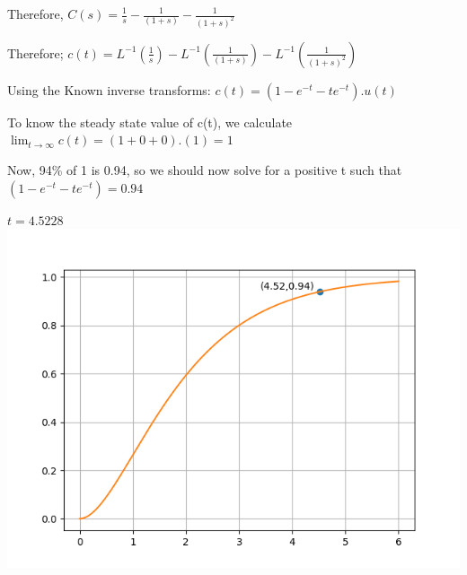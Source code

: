 \documentclass{beamer}
\begin{document}
Therefore,
$C(s) = \frac{1}{s} - \frac{1}{(1+s)} - \frac{1}{(1+s)^2}$

Therefore;
$c(t) = L^{-1} ( \frac{1}{s}) - L^{-1}(\frac{1}{(1+s)}) - L^{-1}(\frac{1}{(1+s)^2}) $

Using the Known inverse transforms:
$c(t) = (1 - e^{-t} - te^{-t}) . u(t)$



To know the steady state value of c(t), we calculate 
$\lim_{t\to\infty} c(t) = (1+0+0).(1) = 1$

Now, 94\% of 1 is 0.94, so we should now solve for a positive t such that
$(1 - e^{-t} - te^{-t}) = 0.94$

$ t = 4.5228$
\includegraphics[scale=0.65]{./../figs/plot.png}
\end{document}
